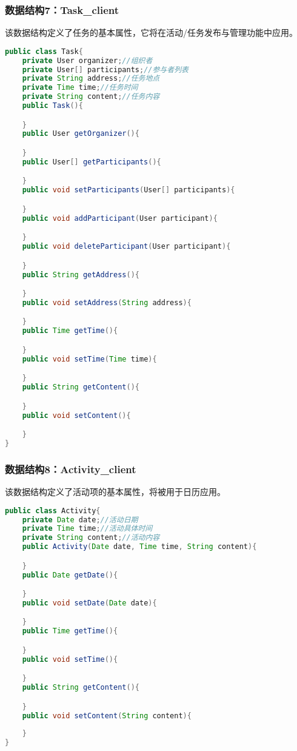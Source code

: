 \subsubsection{数据结构7：Task\_client}
该数据结构定义了任务的基本属性，它将在活动/任务发布与管理功能中应用。
\begin{lstlisting}[language=Java, caption=Task定义]
public class Task{
    private User organizer;//组织者
    private User[] participants;//参与者列表
    private String address;//任务地点
    private Time time;//任务时间
    private String content;//任务内容
    public Task(){

    }
    public User getOrganizer(){

    }
    public User[] getParticipants(){

    }
    public void setParticipants(User[] participants){

    }
    public void addParticipant(User participant){

    }
    public void deleteParticipant(User participant){

    }
    public String getAddress(){

    }
    public void setAddress(String address){

    }
    public Time getTime(){

    }
    public void setTime(Time time){

    }
    public String getContent(){

    }
    public void setContent(){

    }
}
\end{lstlisting}

\subsubsection{数据结构8：Activity\_client}
该数据结构定义了活动项的基本属性，将被用于日历应用。
\begin{lstlisting}[language=Java, caption=Activity定义]
public class Activity{
    private Date date;//活动日期
    private Time time;//活动具体时间
    private String content;//活动内容
    public Activity(Date date, Time time, String content){

    }
    public Date getDate(){

    }
    public void setDate(Date date){

    }
    public Time getTime(){

    }
    public void setTime(){

    }
    public String getContent(){

    }
    public void setContent(String content){
        
    }
}
\end{lstlisting}


